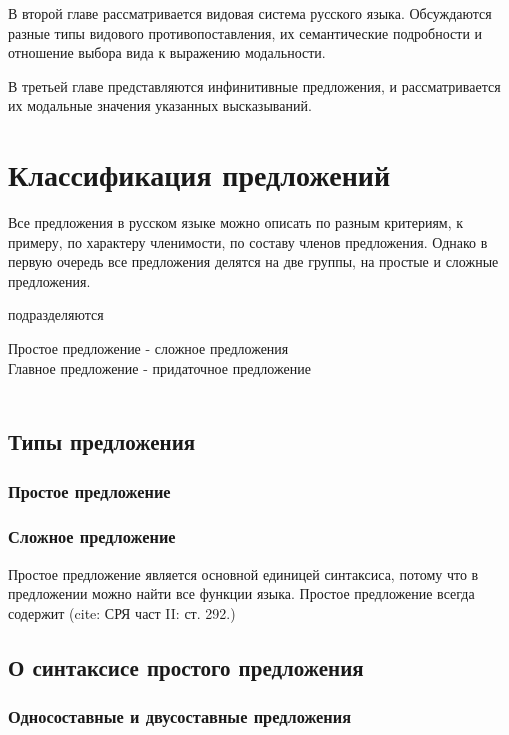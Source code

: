 \documentclass{article}
\begin{document}
В второй главе рассматривается видовая система русского языка. Обсуждаются разные типы видового противопоставления, их семантические подробности и отношение выбора вида к выражению модальности.  

В третьей главе представляются инфинитивные предложения, и рассматривается их модальные значения указанных высказываний.

\section{Классификация предложений}

Все предложения в русском языке можно описать по разным критериям, к примеру, по характеру членимости, по составу членов предложения. Однако в первую очередь все предложения делятся на две группы, на простые и  сложные предложения. 

подразделяются 

Простое предложение - сложное предложения \\
Главное предложение - придаточное предложение \\
\\


\subsection{Типы предложения}

\subsubsection{Простое предложение}

\subsubsection{Сложное предложение}

Простое предложение является основной единицей синтаксиса, потому что в предложении можно найти все функции языка. Простое предложение всегда содержит  (cite: СРЯ част II: ст. 292.) 

\subsection{О синтаксисе простого предложения}

\subsubsection{Односоставные и двусоставные предложения}
\end{document}

